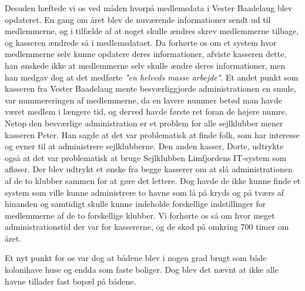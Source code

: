 Desuden hæftede vi os ved måden hvorpå medlemsdata i Vester Baadelaug blev opdateret. En gang om året blev de nuværende informationer sendt ud til medlemmerne, og i tilfælde af at noget skulle ændres skrev medlemmerne tilbage, og kasseren ændrede så i medlemsdataet. Da forhørte os om et system hvor medlemmerne selv kunne opdatere deres informationer, afviste kasseren dette, han ønskede ikke at medlemmerne selv skulle ændre deres informationer, men han medgav dog at det medførte \textit{"en helveds masse arbejde"}. Et andet punkt som kasseren fra Vester Baadelaug mente besværliggjorde administrationen en smule, var nummereringen af medlemmerne, da en lavere nummer betød man havde været medlem i længere tid, og derved havde første ret foran de højere numre. Netop den besværlige administration er et problem for alle sejlklubber mener kasseren Peter. Han sagde at det var problematisk at finde folk, som har interesse og evner til at administrere sejlklubberne. Den anden kasser, Dorte, udtrykte også at det var problematisk at bruge Sejlklubben Limfjordens IT-system som afløser. Der blev udtrykt et ønske fra begge kasserer om at slå administrationen af de to klubber sammen for at gøre det lettere. Dog havde de ikke kunne finde et system som ville kunne administrere to havne som lå på kryds og på tværs af hinanden og samtidigt skulle kunne indeholde forskellige indstillinger for medlemmerne af de to forskellige klubber. Vi forhørte os så om hvor meget administrationstid der var for kassererne, og de skød på omkring 700 timer om året.

Et nyt punkt for os var dog at bådene blev i nogen grad brugt som både kolonihave huse og endda som faste boliger. Dog blev det nævnt at ikke alle havne tillader fast bopæl på bådene. 
 

